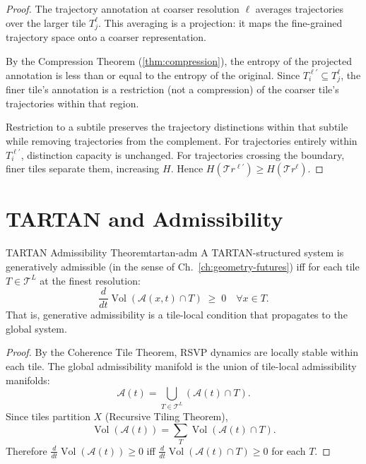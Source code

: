 \documentclass[12pt,twoside,openright]{book}
\newcommand{\adm}{\mathcal{A}}
\newcommand{\Vol}{\operatorname{Vol}}
\begin{document}
\begin{proof}
  The trajectory annotation at coarser resolution
  $\ell$ averages trajectories over the larger tile
  $T^\ell_j$. This averaging is a projection:
  it maps the fine-grained trajectory space onto a
  coarser representation.

  By the Compression Theorem (\cref{thm:compression}),
  the entropy of the projected annotation is less than
  or equal to the entropy of the original.
  Since $T^{\ell'}_i \subseteq T^\ell_j$, the finer
  tile's annotation is a restriction (not a compression)
  of the coarser tile's trajectories within that region.

  Restriction to a subtile preserves the trajectory
  distinctions within that subtile while removing
  trajectories from the complement. For trajectories
  entirely within $T^{\ell'}_i$, distinction capacity
  is unchanged. For trajectories crossing the boundary,
  finer tiles separate them, increasing $H$.
  Hence $H(\mathcal{T}\!r^{\ell'}) \ge H(\mathcal{T}\!r^\ell)$.
\end{proof}

\section{TARTAN and Admissibility}

\begin{theorem}{TARTAN Admissibility Theorem}{tartan-adm}
  A TARTAN-structured system is generatively admissible
  (in the sense of Ch.~\ref{ch:geometry-futures}) iff
  for each tile $T \in \mathcal{T}^L$ at the finest
  resolution:
  \[
    \frac{d}{dt}\Vol(\adm(x, t) \cap T)
    \;\ge\; 0
    \quad \forall x \in T.
  \]
  That is, generative admissibility is a tile-local
  condition that propagates to the global system.
\end{theorem}

\begin{proof}
  By the Coherence Tile Theorem, RSVP dynamics are
  locally stable within each tile. The global
  admissibility manifold is the union of tile-local
  admissibility manifolds:
  \[
    \adm(t) = \bigcup_{T \in \mathcal{T}^L}
    (\adm(t) \cap T).
  \]
  Since tiles partition $X$ (Recursive Tiling Theorem),
  \[
    \Vol(\adm(t))
    = \sum_{T} \Vol(\adm(t) \cap T).
  \]
  Therefore $\frac{d}{dt}\Vol(\adm(t)) \ge 0$ iff
  $\frac{d}{dt}\Vol(\adm(t) \cap T) \ge 0$ for each $T$.
\end{proof}
\end{document}
